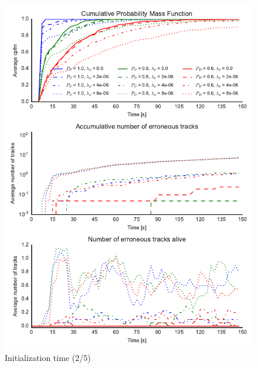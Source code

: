 \begin{figure}
\centering
\includegraphics{Figures/plots/Scenario1_Init-Time(2-5).pdf}
\caption{Initialization time (2/5)}\label{fig:init_time_2-5}
\end{figure}

